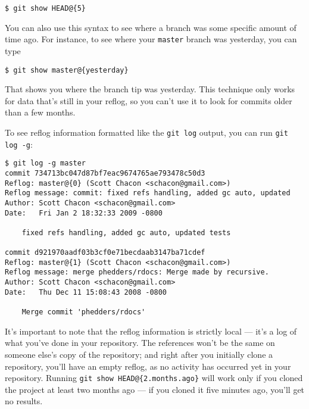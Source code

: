 \documentclass[a4paper]{book}
\begin{document}
\begin{shaded}\begin{verbatim}
$ git show HEAD@{5}
\end{verbatim}\end{shaded}

You can also use this syntax to see where a branch was some specific amount of time ago. For instance, to see where your \texttt{master} branch was yesterday, you can type

\begin{shaded}\begin{verbatim}
$ git show master@{yesterday}
\end{verbatim}\end{shaded}

That shows you where the branch tip was yesterday. This technique only works for data that's still in your reflog, so you can't use it to look for commits older than a few months.

To see reflog information formatted like the \texttt{git log} output, you can run \texttt{git log -g}:

\begin{shaded}\begin{verbatim}
$ git log -g master
commit 734713bc047d87bf7eac9674765ae793478c50d3
Reflog: master@{0} (Scott Chacon <schacon@gmail.com>)
Reflog message: commit: fixed refs handling, added gc auto, updated
Author: Scott Chacon <schacon@gmail.com>
Date:   Fri Jan 2 18:32:33 2009 -0800

    fixed refs handling, added gc auto, updated tests

commit d921970aadf03b3cf0e71becdaab3147ba71cdef
Reflog: master@{1} (Scott Chacon <schacon@gmail.com>)
Reflog message: merge phedders/rdocs: Merge made by recursive.
Author: Scott Chacon <schacon@gmail.com>
Date:   Thu Dec 11 15:08:43 2008 -0800

    Merge commit 'phedders/rdocs'
\end{verbatim}\end{shaded}

It's important to note that the reflog information is strictly local --- it's a log of what you've done in your repository. The references won't be the same on someone else's copy of the repository; and right after you initially clone a repository, you'll have an empty reflog, as no activity has occurred yet in your repository. Running \texttt{git show HEAD@\{2.months.ago\}} will work only if you cloned the project at least two months ago --- if you cloned it five minutes ago, you'll get no results.
\end{document}
